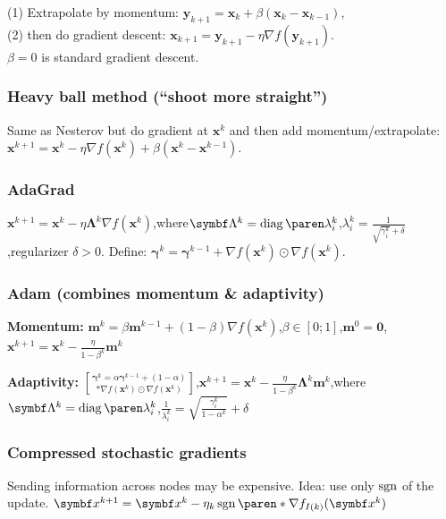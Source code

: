(1) Extrapolate by momentum: $\symbf y_{k+1} = \symbf x_k + \beta (\symbf x_k - \symbf x_{k-1})$,\\
(2) then do gradient descent: $\symbf x_{k+1} = \symbf y_{k+1} - \eta \nabla f(\symbf y_{k+1})$.\\
$\beta = 0$ is standard gradient descent.

\subsubsection{Heavy ball method \enskip\mdseries (``shoot more straight'')}

Same as Nesterov but do gradient at $\symbf x^k$ and then add momentum/extrapolate:
$\symbf x^{k+1} = \symbf x^k - \eta \nabla f(\symbf x^k) + \beta (\symbf x^k - \symbf x^{k-1})$.

\subsubsection{AdaGrad}

$\symbf x^{k+1} = \symbf x^k - \eta \symbf\Lambda^k \nabla f(\symbf x^k)$,\enskip where\enskip $\symbf\Lambda^k = \diag(\lambda_i^k)$,\enskip $\lambda_i^k = \frac{1}{\sqrt{\gamma_i^k} + \delta}$,\enskip regularizer $\delta > 0$.
\quad
Define: $\symbf\gamma^k = \symbf\gamma^{k-1} + \nabla f(\symbf x^k) \odot \nabla f(\symbf x^k)$.

\subsubsection{Adam \enskip\mdseries (combines momentum \& adaptivity)}

\textbf{Momentum:}
$\symbf m^k = \beta \symbf m^{k-1} + (1 - \beta) \nabla f(\symbf x^k)$,\enskip $\beta \in [0;1]$,\enskip $\symbf m^0 = \symbf 0$,\enskip $\symbf x^{k+1} = \symbf x^k - \frac{\eta}{1 - \beta^k} \symbf m^k$

\textbf{Adaptivity:}
$\symbf\gamma^k = \alpha \symbf\gamma^{k-1} + (1 - \alpha) \brack*{\nabla f(\symbf x^k) \odot \nabla f(\symbf x^k)}$,\enskip $\symbf x^{k+1} = \symbf x^k - \frac{\eta}{1 - \beta^k} \symbf\Lambda^k \symbf m^k$,\enskip where\enskip $\symbf\Lambda^k = \diag(\lambda_i^k)$,\enskip $\frac{1}{\lambda_i^k} = \sqrt{\frac{\gamma_i^k}{1 - \alpha^k}} + \delta$

\subsubsection{Compressed stochastic gradients}

Sending information across nodes may be expensive. Idea: use only $\sign$ of the update.
$\symbf x^{k+1} = \symbf x^k - \eta_k \sign*(\nabla f_{I(k)} (\symbf x^k))$



